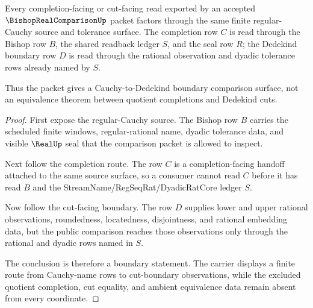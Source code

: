 \begin{theorem}
\label{thm:bishop-real-comparison-cauchy-dedekind-boundary}
Every completion-facing or cut-facing read exported by an accepted $\BishopRealComparisonUp$ packet factors through the same finite regular-Cauchy source and tolerance surface. The completion row $C$ is read through the Bishop row $B$, the shared readback ledger $S$, and the seal row $R$; the Dedekind boundary row $D$ is read through the rational observation and dyadic tolerance rows already named by $S$.

Thus the packet gives a Cauchy-to-Dedekind boundary comparison surface, not an equivalence theorem between quotient completions and Dedekind cuts.
\end{theorem}
\begin{proof}
First expose the regular-Cauchy source. The Bishop row $B$ carries the scheduled finite windows, regular-rational name, dyadic tolerance data, and visible $\RealUp$ seal that the comparison packet is allowed to inspect.

Next follow the completion route. The row $C$ is a completion-facing handoff attached to the same source surface, so a consumer cannot read $C$ before it has read $B$ and the StreamName/RegSeqRat/DyadicRatCore ledger $S$.

Now follow the cut-facing boundary. The row $D$ supplies lower and upper rational observations, roundedness, locatedness, disjointness, and rational embedding data, but the public comparison reaches those observations only through the rational and dyadic rows named in $S$.

The conclusion is therefore a boundary statement. The carrier displays a finite route from Cauchy-name rows to cut-boundary observations, while the excluded quotient completion, cut equality, and ambient equivalence data remain absent from every coordinate.
\end{proof}

